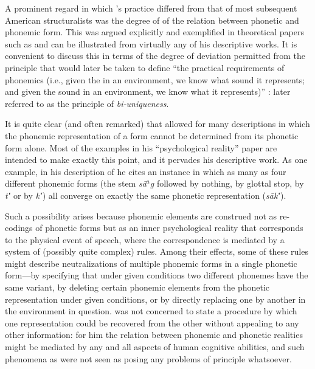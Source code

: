 A prominent regard in which {\Sapir}'s practice differed from that of
most subsequent American structuralists was the degree of 
of the relation between phonetic and phonemic form. This was argued
explicitly and exemplified in theoretical papers such as
\citealt{sapir33:reality} and can be illustrated from virtually any of
his descriptive works. It is convenient to discuss this 
in terms of the degree of deviation {\Sapir} permitted from the principle
that would later be taken to define ``the practical requirements of
phonemics (i.e., given the  in an environment, we know what
sound it represents; and given the sound in an environment, we know
what  it represents)'' \citep[239]{harris45:navajo}: later
referred to as the principle of \emph{bi-uniqueness}.

It is quite clear (and often remarked) that {\Sapir} allowed for many
descriptions in which the phonemic representation of a form cannot be
determined from its phonetic form alone. Most of the examples in his
``psychological reality'' paper \citep{sapir33:reality} are intended to
make exactly this point, and it pervades his descriptive work. As one
example, in his description of  \citep{sapir22:takelma} he
cites an instance in which as many as four different phonemic forms
(the stem \emph{sā$^{a}$g} followed by nothing, by glottal stop, by
\emph{tʽ} or by \emph{kʽ}) all converge on exactly the same phonetic
representation (\emph{sākʽ}).

Such a possibility arises because phonemic elements are construed not
as re-codings of phonetic forms but as an inner psychological reality
that corresponds to the physical event of speech, where the
correspondence is mediated by a system of (possibly quite complex)
rules. Among their effects, some of these rules might describe
neutralizations of multiple phonemic forms in a single phonetic
form—by specifying that under given conditions two different phonemes
have the same variant, by deleting certain phonemic elements from the
phonetic representation under given conditions, or by directly
replacing one  by another in the environment in question. {\Sapir}
was not concerned to state a procedure by which one representation
could be recovered from the other without appealing to any other
information: for him the relation between phonemic and phonetic
realities might be mediated by any and all aspects of human cognitive
abilities, and such phenomena as  were not seen as
posing any problems of principle whatsoever.

